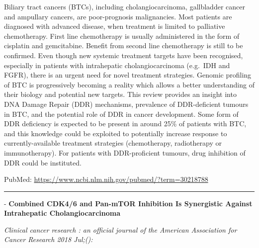 \documentclass[]{article}
\begin{document}
Biliary tract cancers (BTCs), including cholangiocarcinoma, gallbladder
cancer and ampullary cancers, are poor-prognosis malignancies. Most
patients are diagnosed with advanced disease, when treatment is limited
to palliative chemotherapy. First line chemotherapy is usually
administered in the form of cisplatin and gemcitabine. Benefit from
second line chemotherapy is still to be confirmed. Even though new
systemic treatment targets have been recognised, especially in patients
with intrahepatic cholangiocarcinoma (e.g.~IDH and FGFR), there is an
urgent need for novel treatment strategies. Genomic profiling of BTC is
progressively becoming a reality which allows a better understanding of
their biology and potential new targets. This review provides an insight
into DNA Damage Repair (DDR) mechanisms, prevalence of DDR-deficient
tumours in BTC, and the potential role of DDR in cancer development.
Some form of DDR deficiency is expected to be present in around 25\% of
patients with BTC, and this knowledge could be exploited to potentially
increase response to currently-available treatment strategies
(chemotherapy, radiotherapy or immunotherapy). For patients with
DDR-proficient tumours, drug inhibition of DDR could be instituted.

PubMed: \url{https://www.ncbi.nlm.nih.gov/pubmed/?term=30218788}

{}

{}

\begin{center}\rule{0.5\linewidth}{\linethickness}\end{center}

 - \textbf{Combined CDK4/6 and Pan-mTOR Inhibition Is Synergistic
Against Intrahepatic Cholangiocarcinoma}

\emph{Clinical cancer research : an official journal of the American
Association for Cancer Research 2018 Jul;():}
\end{document}
